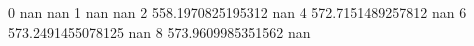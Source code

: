 0 nan nan
1 nan nan
2 558.1970825195312 nan
4 572.7151489257812 nan
6 573.2491455078125 nan
8 573.9609985351562 nan

